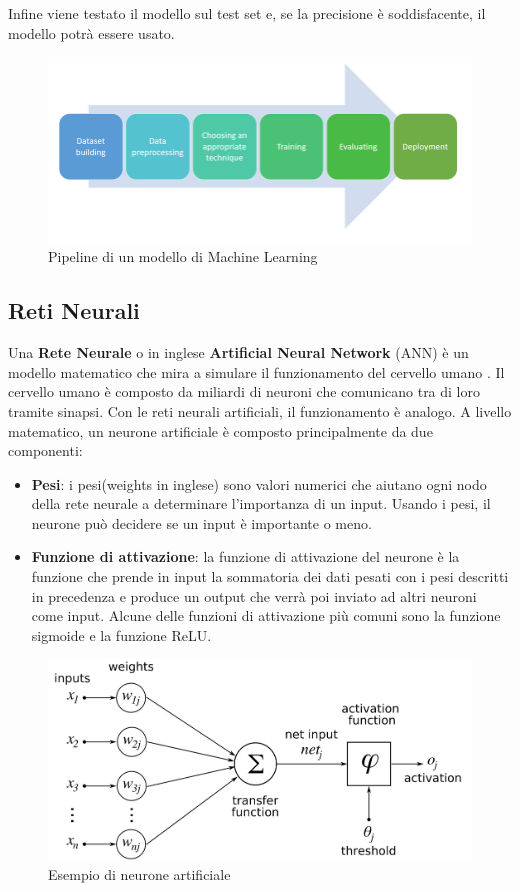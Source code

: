 \documentclass[12pt,a4paper,openright,twoside]{book}
\begin{document}
Infine viene testato il modello sul test set e, se la precisione
è soddisfacente, il modello potrà essere usato.
\begin{figure}[H]
    \centering
    \includegraphics[width=.8\linewidth]{figures/Machine-learning-pipeline.png}
    \caption{Pipeline di un modello di Machine Learning \cite{phdthesishamza}}
    \label{fig:ML pipeline}
\end{figure}

\subsection{Reti Neurali}

Una \textbf{Rete Neurale} o in inglese \textbf{Artificial Neural Network} (ANN) è
un modello matematico che mira a simulare il
funzionamento del cervello umano \cite{zou2009overview}.
Il cervello umano è composto da miliardi di neuroni
che comunicano tra di loro tramite sinapsi.
Con le reti neurali artificiali, il funzionamento
è analogo. A livello matematico, un neurone artificiale è composto principalmente
da due componenti:
\begin{itemize}
    \item \textbf{Pesi}: i pesi(weights in inglese) sono valori numerici che
    aiutano ogni nodo della rete neurale a determinare
    l'importanza di un input. Usando i pesi, il neurone
    può decidere se un input è importante o meno.
    \item \textbf{Funzione di attivazione}: la funzione di attivazione del neurone è la funzione
    che prende in input la sommatoria dei dati pesati con i pesi descritti in
    precedenza e produce un output che verrà poi inviato ad altri neuroni come
    input. Alcune delle funzioni di attivazione più comuni sono la funzione
    sigmoide e la funzione ReLU.
\end{itemize}

\begin{figure}[H]
    \centering
    \includegraphics[width=.8\linewidth]{figures/ArtificialNeuronModel.png}
    \caption{Esempio di neurone artificiale \cite{wiki:xxx}}
    \label{fig:AN}
\end{figure}
\end{document}
